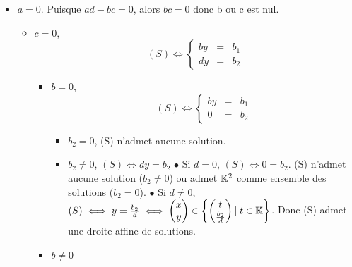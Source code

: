 \documentclass{article}
\renewenvironment{question_kholle}[2][ ]
{
	\subsection{\texorpdfstring{#2}{}}
	\notblank{#1}
	{
		\noindent #1
		\bigbreak
	}
	{}
	\begin{proof}
}
{
	\end{proof}
}
\begin{document}
\begin{question_kholle}
\begin{itemize}[label=$\bullet$ Supposons]
		\item $a = 0$. Puisque $ad - bc = 0$, alors $bc = 0$ donc b ou c est nul.

		      \begin{itemize}[label=$\bullet$ Si]
			      \item $c = 0$,
			            \begin{equation*}
				            (S) \iff
				            \left\{ \begin{array}{ccc}
					            by & = & b_1 \\
					            dy & = & b_2
				            \end{array} \right.
			            \end{equation*}

			            \begin{itemize}[label=$\bullet$ Si]
				            \item $b = 0$,
				                  \begin{equation*}
					                  (S) \iff
					                  \left\{ \begin{array}{ccc}
						                  by & = & b_1 \\
						                  0  & = & b_2
					                  \end{array} \right.
				                  \end{equation*}
				                  \begin{itemize}[label=$\bullet$ Si]
					                  \item $b_2 = 0$, (S) n'admet aucune solution.
					                  \item $b_2 \neq 0$, $(S) \iff dy = b_2$
					                        \subitem$\bullet$ Si $d = 0$, $(S) \iff 0 = b_2$. (S) n'admet aucune solution ($b_2 \neq 0$) ou admet $\mathbb K^2$ comme ensemble des solutions ($b_2 = 0$).
					                        \subitem$\bullet$ Si $d \neq 0$, $(S) \iff y = \frac{b_2}{d} \iff \begin{pmatrix} x \\ y \end{pmatrix} \in \begin{Bmatrix} \begin{pmatrix} t \\ \frac{b_2}{d} \end{pmatrix} |\; t \in \mathbb K \end{Bmatrix}$. Donc (S) admet une droite affine de solutions.
				                  \end{itemize}
				            \item $b \neq 0$

\end{itemize}
\end{itemize}
\end{itemize}
\end{question_kholle}
\end{document}
